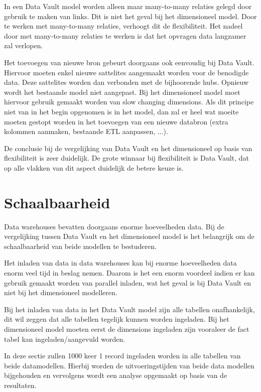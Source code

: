 In een Data Vault model worden alleen maar many-to-many relaties gelegd door gebruik te maken van links. Dit is niet het geval bij het dimensioneel model. Door te werken met many-to-many relaties, verhoogt dit de flexibiliteit. Het nadeel door met many-to-many relaties te werken is dat het opvragen data langzamer zal verlopen.

Het toevoegen van nieuwe bron gebeurt doorgaans ook eenvoudig bij Data Vault. Hiervoor moeten enkel nieuwe sattelites aangemaakt worden voor de benodigde data. Deze sattelites worden dan verbonden met de bijhoorende hubs. Opnieuw wordt het bestaande model niet aangepast. Bij het dimensioneel model moet hiervoor gebruik gemaakt worden van slow changing dimensions. Als dit principe niet van in het begin opgenomen is in het model, dan zal er heel wat moeite moeten gestopt worden in het toevoegen van een nieuwe databron (extra kolommen aanmaken, bestaande ETL aanpassen, ...).

De conclusie bij de vergelijking van Data Vault en het dimensioneel op basis van flexibiliteit is zeer duidelijk. De grote winnaar bij flexibiliteit is Data Vault, dat op alle vlakken van dit aspect duidelijk de betere keuze is.

\section{Schaalbaarheid}
Data warehouses bevatten doorgaans enorme hoeveelheden data. Bij de vergelijking tussen Data Vault en het dimensioneel model is het belangrijk om de schaalbaarheid van beide modellen te bestuderen. 

Het inladen van data in data warehouses kan bij enorme hoeveelheden data enorm veel tijd in beslag nemen. Daarom is het een enorm voordeel indien er kan gebruik gemaakt worden van parallel inladen, wat het geval is bij Data Vault en niet bij het dimensioneel modelleren.

Bij het inladen van data in het Data Vault model zijn alle tabellen onafhankelijk, dit wil zeggen dat alle tabellen tegelijk kunnen worden ingeladen. Bij het dimensioneel model moeten eerst de dimensions ingeladen zijn vooraleer de fact tabel kan ingeladen/aangevuld worden.

In deze sectie zullen 1000 keer 1 record ingeladen worden in alle tabellen van beide datamodellen. Hierbij worden de uitvoeringstijden van beide data modellen bijgehouden en vervolgens wordt een analyse opgemaakt op basis van de resultaten.

